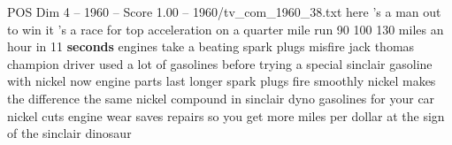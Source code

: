 \begin{textsample}{POS Dim 4 – 1960 – Score 1.00 – 1960/tv\_com\_1960\_38.txt}  \label{ex:f4_pos_015}
here 's a man out to win it 's a race for top acceleration on a quarter mile run 90 100 130 miles an hour in 11 \textbf{seconds} engines take a beating spark plugs misfire jack thomas champion driver used a lot of gasolines before trying a special sinclair gasoline with nickel now engine parts last longer spark plugs fire smoothly nickel makes the difference the same nickel compound in sinclair dyno gasolines for your car nickel cuts engine wear saves repairs so you get more miles per dollar at the sign of the sinclair dinosaur

\end{textsample}
